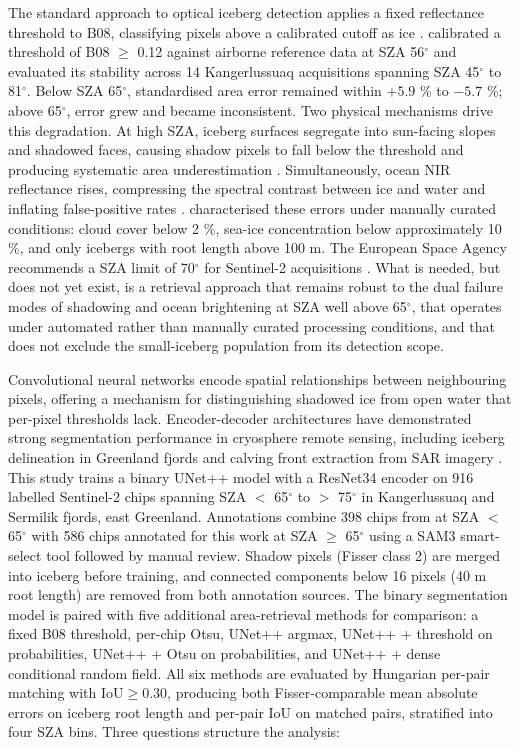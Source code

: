 \documentclass[review,jog]{igs}
\begin{document}
The standard approach to optical iceberg detection applies a fixed reflectance threshold to B08, classifying pixels above a calibrated cutoff as ice \citep{Sulak2017, Moyer2019, Scheick2019}. \citet{Fisser2024} calibrated a threshold of B08 $\geq$ 0.12 against airborne reference data at SZA 56$^\circ$ and evaluated its stability across 14 Kangerlussuaq acquisitions spanning SZA 45$^\circ$ to 81$^\circ$. Below SZA 65$^\circ$, standardised area error remained within $+5.9$ \% to $-5.7$ \%; above 65$^\circ$, error grew and became inconsistent. Two physical mechanisms drive this degradation. At high SZA, iceberg surfaces segregate into sun-facing slopes and shadowed faces, causing shadow pixels to fall below the threshold and producing systematic area underestimation \citep{Fisser2024, Gardner2010}. Simultaneously, ocean NIR reflectance rises, compressing the spectral contrast between ice and water and inflating false-positive rates \citep{Pegau2001}. \citet{Fisser2024} characterised these errors under manually curated conditions: cloud cover below 2 \%, sea-ice concentration below approximately 10 \%, and only icebergs with root length above 100 m. The European Space Agency recommends a SZA limit of 70$^\circ$ for Sentinel-2 acquisitions \citep{ESA2019}. What is needed, but does not yet exist, is a retrieval approach that remains robust to the dual failure modes of shadowing and ocean brightening at SZA well above 65$^\circ$, that operates under automated rather than manually curated processing conditions, and that does not exclude the small-iceberg population from its detection scope.

Convolutional neural networks encode spatial relationships between neighbouring pixels, offering a mechanism for distinguishing shadowed ice from open water that per-pixel thresholds lack. Encoder-decoder architectures have demonstrated strong segmentation performance in cryosphere remote sensing, including iceberg delineation in Greenland fjords \citep{Rezvanbehbahani2020} and calving front extraction from SAR imagery \citep{Baumhoer2019}. This study trains a binary UNet++ model \citep{Zhou2018} with a ResNet34 encoder \citep{He2016} on 916 labelled Sentinel-2 chips spanning SZA $<$ 65$^\circ$ to $>$ 75$^\circ$ in Kangerlussuaq and Sermilik fjords, east Greenland. Annotations combine 398 chips from \citet{Fisser2024} at SZA $<$ 65$^\circ$ with 586 chips annotated for this work at SZA $\geq$ 65$^\circ$ using a SAM3 smart-select tool followed by manual review. Shadow pixels (Fisser class 2) are merged into iceberg before training, and connected components below 16 pixels (40 m root length) are removed from both annotation sources. The binary segmentation model is paired with five additional area-retrieval methods for comparison: a fixed B08 threshold, per-chip Otsu, UNet++ argmax, UNet++ + threshold on probabilities, UNet++ + Otsu on probabilities, and UNet++ + dense conditional random field. All six methods are evaluated by Hungarian per-pair matching with $\mathrm{IoU} \geq 0.30$, producing both Fisser-comparable mean absolute errors on iceberg root length and per-pair IoU on matched pairs, stratified into four SZA bins. Three questions structure the analysis:
\end{document}
